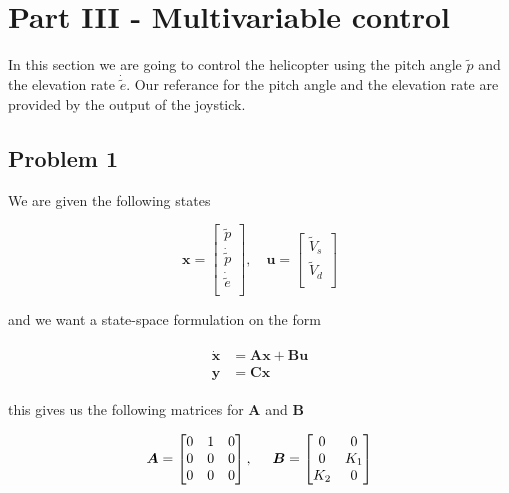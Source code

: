 \section{Part III - Multivariable control}
In this section we are going to control the helicopter using the pitch angle $\tilde{p}$ and the elevation rate $\dot{\tilde{e}}$. Our referance for the pitch angle and the elevation rate are provided by the output of the joystick. 

\subsection{Problem 1}

We are given the following states

\begin{equation}
  \label{eq:state_space_vectors}
  \bm{x} =
  \begin{bmatrix}
    \tilde{p} \\
    \dot{\tilde{p}} \\
    \dot{\tilde{e}} \\
  \end{bmatrix} ,
  \quad \bm{u} =
  \begin{bmatrix}
    \tilde{V}_s \\
    \tilde{V}_d \\
  \end{bmatrix}
\end{equation}

and we want a state-space formulation on the form

\begin{align}
  \begin{split}
    \dot{\bm{x}} &= \bm{Ax} + \bm{Bu} \\
    \bm{y} &= \bm{Cx}
  \end{split}
\end{align}

this gives us the following matrices for $\bm{A}$ and $\bm{B}$

\begin{equation}
  \boldsymbol{A} = \begin{bmatrix}
    0 & 1 & 0 \\
    0 & 0 & 0 \\
    0 & 0 & 0 \\
  \end{bmatrix}, \hspace{0.5cm}
  \boldsymbol{B} = \begin{bmatrix}
    0 & 0 \\
    0 & K_1 \\
    K_2 & 0 \\
  \end{bmatrix}
\end{equation}


